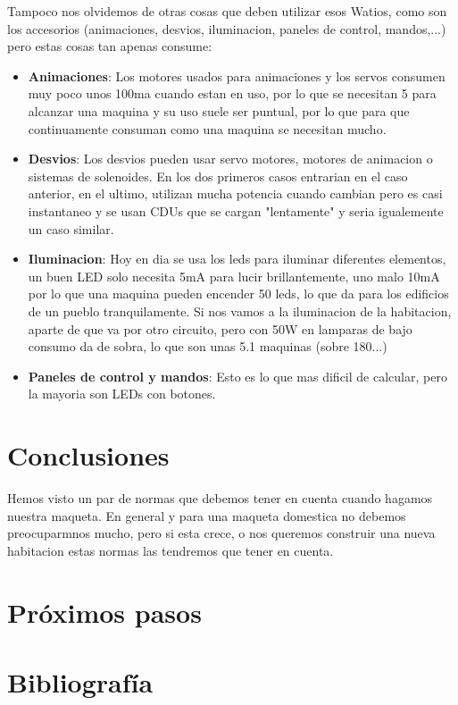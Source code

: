 Tampoco nos olvidemos de otras cosas que deben utilizar esos Watios, como son los accesorios (animaciones, desvios, iluminacion, paneles de control, mandos,...) pero estas cosas tan apenas consume:
\begin{itemize}
\item \textbf{Animaciones}: Los motores usados para  animaciones y los servos consumen muy poco unos 100ma cuando estan en uso, por lo que se necesitan 5 para alcanzar una maquina y su uso suele ser puntual, por lo que para que continuamente consuman como una maquina se necesitan mucho.

\item \textbf{Desvios}: Los desvios pueden usar servo motores, motores de animacion o sistemas de solenoides. En los dos primeros casos entrarian en el caso anterior, en el ultimo, utilizan mucha potencia cuando cambian pero es casi instantaneo y se usan CDUs que se cargan "lentamente" y seria igualemente un caso similar.

\item \textbf{Iluminacion}: Hoy en dia se usa los leds para iluminar diferentes elementos, un buen LED solo necesita 5mA para lucir brillantemente, uno malo 10mA por lo que una maquina pueden encender 50 leds, lo que da para los edificios de un pueblo tranquilamente. Si nos vamos a la iluminacion de la habitacion, aparte de que va por otro circuito, pero con 50W en lamparas de bajo consumo da de sobra, lo que son unas 5.1 maquinas (sobre 180...)

\item \textbf{Paneles de control y mandos}: Esto es lo que mas dificil de calcular, pero la mayoria son LEDs con botones.   
\end{itemize} 

\section{Conclusiones}
Hemos visto un par de normas que debemos tener en cuenta cuando hagamos nuestra maqueta. En general y para una maqueta domestica no debemos preocuparmnos mucho, pero si esta crece, o nos queremos construir una nueva habitacion estas normas las tendremos que tener en cuenta.



\section{Próximos pasos}

\section{Bibliografía}
\printbibliography[heading=subbibliography]
	
